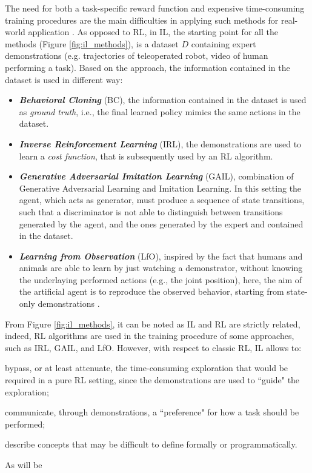 
\noindent The need for both a task-specific reward function and expensive time-consuming training procedures are the main difficulties in applying such methods for real-world application
\cite{hussein2017imitation_learning_survey}. \newline As opposed to RL, in IL, the starting point for all the methods
(Figure \ref{fig:il_methods}), is a dataset $D$ containing expert demonstrations (e.g. trajectories of teleoperated
robot, video of human performing a task). Based on the approach, the information contained in the dataset
is used in different way:
\begin{itemize}
    \item \textbf{\textit{Behavioral Cloning}} (BC), the information contained in the dataset is used as \textit{ground
    truth}, i.e., the final learned policy mimics the same actions in the dataset.
    \item \textbf{\textit{Inverse Reinforcement Learning}} (IRL), the demonstrations are used to learn a \textit{cost
    function}, that is subsequently used by an RL algorithm.
    \item \textbf{\textit{Generative Adversarial Imitation Learning}} (GAIL), combination of Generative Adversarial Learning and Imitation Learning. In this
    setting the agent, which acts as generator, must produce a sequence of state transitions, such that a
    discriminator is not able to distinguish between transitions generated by the agent, and the ones generated by the expert and contained in the dataset.
    \item \textbf{\textit{Learning from Observation}} (LfO), inspired by the fact that humans and animals are able to
    learn by just watching a demonstrator, without knowing the underlaying performed actions (e.g., the joint position),
    here, the aim of the artificial agent is to reproduce the observed behavior, starting from state-only demonstrations
    \cite{torabi2019recent_advances_lfo}.  
\end{itemize}

\noindent From Figure \ref{fig:il_methods}, it can be noted as IL and RL are strictly related, indeed, RL algorithms are used in
the training procedure of some approaches, such as IRL, GAIL, and LfO. However, with respect to classic RL, IL allows to:
\begin{enumerate*}[label=\textbf{(\arabic*)}]
    \item bypass, or at least attenuate, the time-consuming exploration that would be required in a pure RL setting, since the demonstrations are used to ``guide" the exploration;
    \item communicate, through demonstrations, a ``preference" for how a task should be performed;
    \item describe concepts that may be difficult to define formally or programmatically. \end{enumerate*} As will be
